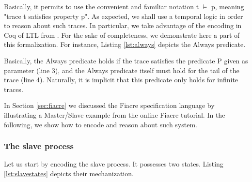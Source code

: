 	\noindent Basically, it permits to use the convenient and familiar notation \textsf{t $\vDash$ p}, meaning
	"trace \textsf{t} satisfies property \textsf{p}". As expected, we shall use a temporal logic in order to reason 
	about such traces. In particular, we take advantage of the encoding in Coq of \ac{LTL} from
	\cite[sec. 13.9]{opac-b1101046}. For the sake of completeness, we demonstrate here a part of 
	this formalization. For instance, Listing \ref{lst:always} depicts the \textsf{Always} predicate.
	




  	
	
	\noindent Basically, the \textsf{Always} predicate holds if the trace  
	satisfies the predicate \textsf{P} given as parameter (line 3), and the \textsf{Always} predicate
	itself must hold for the tail of the trace (line 4). Naturally, it is implicit that this 
	predicate only holds for infinite traces.

	In Section \ref{sec:fiacre} we discussed the Fiacre specification language by illustrating a 
	Master/Slave example from the online Fiacre tutorial. In the following, we show how to encode
	and reason about such system.
	
	
\subsubsection{The slave process}	
\label{subsub:slave}
	
		Let us start by encoding the slave process. It possesses two states. Listing \ref{lst:slavestates}
		depicts their mechanization.
		
  	


